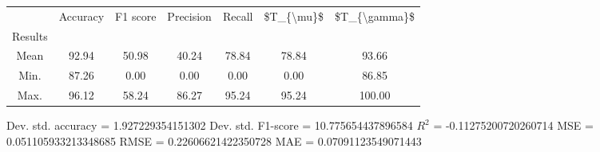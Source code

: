 \begin{tabular}{|c|c|c|c|c|c|c|}
\toprule
{} &  Accuracy &  F1 score &  Precision &  Recall &  \$T\_\{\textbackslash mu\}\$ &  \$T\_\{\textbackslash gamma\}\$ \\
Results &           &           &            &         &            &               \\
\hline
Mean    &     92.94 &     50.98 &      40.24 &   78.84 &      78.84 &         93.66 \\
Min.    &     87.26 &      0.00 &       0.00 &    0.00 &       0.00 &         86.85 \\
Max.    &     96.12 &     58.24 &      86.27 &   95.24 &      95.24 &        100.00 \\
\bottomrule
\end{tabular}

 Dev. std. accuracy = 1.927229354151302
 Dev. std. F1-score = 10.775654437896584
 $R^2$ = -0.11275200720260714
 MSE = 0.051105933213348685
 RMSE = 0.22606621422350728
 MAE = 0.07091123549071443